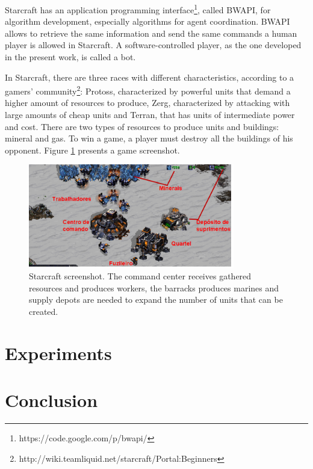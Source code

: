 \documentclass[conference]{IEEEtran}
\begin{document}
Starcraft has an application programming interface\footnote{https://code.google.com/p/bwapi/}, called BWAPI, for algorithm development, especially algorithms for agent coordination. BWAPI allows to retrieve the same information and send the same commands a human player is allowed in Starcraft. A software-controlled player, as the one developed in the present work, is called a bot. 

In Starcraft, there are three races with different characteristics, according to a gamers' community\footnote{http://wiki.teamliquid.net/starcraft/Portal:Beginners}: Protoss, characterized by powerful units that demand a higher amount of resources to produce, Zerg, characterized by attacking with large amounts of cheap units and Terran, that has units of intermediate power and cost. There are two types of resources to produce units and buildings: mineral and gas. To win a game, a player must destroy all the buildings of his opponent. Figure \ref{fig:scsshot} presents a game screenshot.

\begin{figure}[ht]
    \centerline{\includegraphics[width=9cm]{img/scsshot.png}}
    \caption{Starcraft screenshot. The command center receives gathered resources and produces workers, the barracks produces marines and supply depots are needed to expand the number of units that can be created.}
    \label{fig:scsshot}
\end{figure}

\section{Experiments}
\label{sec:experiments}




\section{Conclusion}
\label{sec:conclusion}
\end{document}
